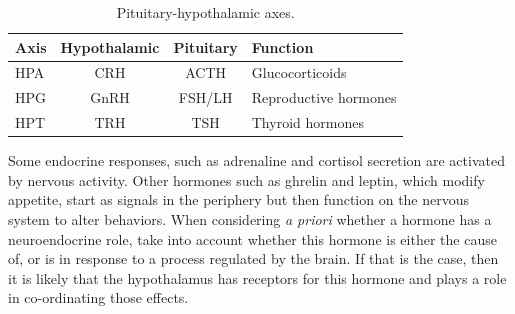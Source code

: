 \documentclass{tufte-handout}
\begin{document}
\begin{table}
  \centering
  \begin{tabular}{lccl}
    \toprule
    Axis & Hypothalamic & Pituitary & Function \\
    \midrule
    HPA & CRH & ACTH & Glucocorticoids \\
    HPG & GnRH & FSH/LH & Reproductive hormones \\
    HPT & TRH & TSH & Thyroid hormones \\
    \bottomrule
  \end{tabular}
  \caption{Pituitary-hypothalamic axes.}
  \label{tab:pituitary-axes}
\end{table}

  Some endocrine responses, such as adrenaline and cortisol secretion are activated by nervous activity.  Other hormones such as ghrelin and leptin, which modify appetite, start as signals in the periphery but then function on the nervous system to alter behaviors.  When considering \textit{a priori} whether a hormone has a neuroendocrine role, take into account whether this hormone is either the cause of, or is in response to a process regulated by the brain.  If that is the case, then it is likely that the hypothalamus has receptors for this hormone and plays a role in co-ordinating those effects.

\listoffigures
\listoftables



\end{document}
